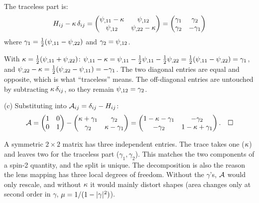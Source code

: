 The traceless part is:
\begin{equation*}
    H_{ij} - \kappa\,\delta_{ij}
    = \begin{pmatrix}
    \psi_{,11} - \kappa & \psi_{,12} \\
    \psi_{,12} & \psi_{,22} - \kappa
    \end{pmatrix}
    = \begin{pmatrix}
    \gamma_1 & \gamma_2 \\
    \gamma_2 & -\gamma_1
    \end{pmatrix}
\end{equation*}
where $\gamma_1 = \frac{1}{2}(\psi_{,11} - \psi_{,22})$ and
$\gamma_2 = \psi_{,12}$.
\begin{derivation}
With $\kappa = \tfrac12(\psi_{,11} + \psi_{,22})$:
$\psi_{,11} - \kappa = \psi_{,11} - \tfrac12\psi_{,11} - \tfrac12\psi_{,22}
= \tfrac12(\psi_{,11} - \psi_{,22}) = \gamma_1$, and
$\psi_{,22} - \kappa = \tfrac12(\psi_{,22} - \psi_{,11}) = -\gamma_1$.
The two diagonal entries are equal and opposite, which is what ``traceless''
means. The off-diagonal entries are untouched by subtracting
$\kappa\,\delta_{ij}$, so they remain $\psi_{,12} = \gamma_2$.
\end{derivation}

(c) Substituting into $\mathcal{A}_{ij} = \delta_{ij} - H_{ij}$:
\begin{equation*}
    \mathcal{A} = \begin{pmatrix} 1 & 0 \\ 0 & 1 \end{pmatrix}
    - \begin{pmatrix}
    \kappa + \gamma_1 & \gamma_2 \\
    \gamma_2 & \kappa - \gamma_1
    \end{pmatrix}
    = \begin{pmatrix}
    1 - \kappa - \gamma_1 & -\gamma_2 \\
    -\gamma_2 & 1 - \kappa + \gamma_1
    \end{pmatrix} . \quad \square
\end{equation*}
\begin{annotation}
A symmetric $2\times2$ matrix has three independent entries. The trace takes
one ($\kappa$) and leaves two for the traceless part ($\gamma_1, \gamma_2$).
This matches the two components of a spin-2 quantity, and the split is unique.
The decomposition is also the reason the lens mapping has three local
degrees of freedom. Without the $\gamma$'s, $\mathcal{A}$ would only rescale, and without
$\kappa$ it would mainly distort shapes (area changes only at second order in
$\gamma$, $\mu = 1/(1-|\gamma|^2)$).
\end{annotation}

